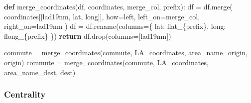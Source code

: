 \documentclass[
  number]{elsarticle}
\newenvironment{Shaded}{\begin{snugshade}}{\end{snugshade}}
\newcommand{\ControlFlowTok}[1]{\textcolor[rgb]{0.00,0.23,0.31}{\textbf{#1}}}
\newcommand{\KeywordTok}[1]{\textcolor[rgb]{0.00,0.23,0.31}{\textbf{#1}}}
\newcommand{\NormalTok}[1]{\textcolor[rgb]{0.00,0.23,0.31}{#1}}
\newcommand{\OperatorTok}[1]{\textcolor[rgb]{0.37,0.37,0.37}{#1}}
\newcommand{\SpecialCharTok}[1]{\textcolor[rgb]{0.37,0.37,0.37}{#1}}
\newcommand{\SpecialStringTok}[1]{\textcolor[rgb]{0.13,0.47,0.30}{#1}}
\newcommand{\StringTok}[1]{\textcolor[rgb]{0.13,0.47,0.30}{#1}}
\begin{document}
\begin{Shaded}
\begin{Highlighting}[]
\KeywordTok{def}\NormalTok{ merge\_coordinates(df, coordinates, merge\_col, prefix):}
\NormalTok{    df }\OperatorTok{=}\NormalTok{ df.merge(}
\NormalTok{        coordinates[[}\StringTok{\textquotesingle{}lad19nm\textquotesingle{}}\NormalTok{, }\StringTok{\textquotesingle{}lat\textquotesingle{}}\NormalTok{, }\StringTok{\textquotesingle{}long\textquotesingle{}}\NormalTok{]],}
\NormalTok{        how}\OperatorTok{=}\StringTok{\textquotesingle{}left\textquotesingle{}}\NormalTok{,}
\NormalTok{        left\_on}\OperatorTok{=}\NormalTok{merge\_col,}
\NormalTok{        right\_on}\OperatorTok{=}\StringTok{\textquotesingle{}lad19nm\textquotesingle{}}
\NormalTok{    )}
\NormalTok{    df }\OperatorTok{=}\NormalTok{ df.rename(columns}\OperatorTok{=}\NormalTok{\{}
        \StringTok{\textquotesingle{}lat\textquotesingle{}}\NormalTok{: }\SpecialStringTok{f\textquotesingle{}lat\_}\SpecialCharTok{\{}\NormalTok{prefix}\SpecialCharTok{\}}\SpecialStringTok{\textquotesingle{}}\NormalTok{,}
        \StringTok{\textquotesingle{}long\textquotesingle{}}\NormalTok{: }\SpecialStringTok{f\textquotesingle{}long\_}\SpecialCharTok{\{}\NormalTok{prefix}\SpecialCharTok{\}}\SpecialStringTok{\textquotesingle{}}
\NormalTok{    \})}
    \ControlFlowTok{return}\NormalTok{ df.drop(columns}\OperatorTok{=}\NormalTok{[}\StringTok{\textquotesingle{}lad19nm\textquotesingle{}}\NormalTok{])}
\end{Highlighting}
\end{Shaded}

\begin{Shaded}
\begin{Highlighting}[]
\NormalTok{commute }\OperatorTok{=}\NormalTok{ merge\_coordinates(commute, LA\_coordinates, }\StringTok{\textquotesingle{}area\_name\_origin\textquotesingle{}}\NormalTok{, }\StringTok{\textquotesingle{}origin\textquotesingle{}}\NormalTok{)}
\NormalTok{commute }\OperatorTok{=}\NormalTok{ merge\_coordinates(commute, LA\_coordinates, }\StringTok{\textquotesingle{}area\_name\_dest\textquotesingle{}}\NormalTok{, }\StringTok{\textquotesingle{}dest\textquotesingle{}}\NormalTok{)}
\end{Highlighting}
\end{Shaded}

\subsubsection{Centrality}\label{sec-centrality}
\end{document}
